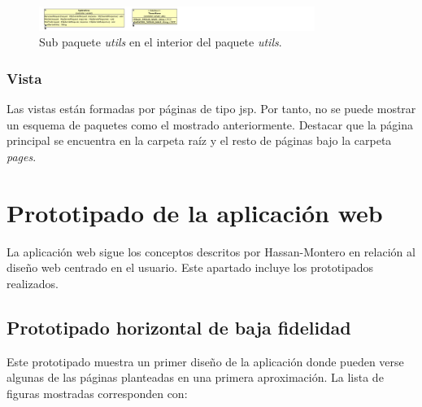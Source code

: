 \begin{figure}[!htbp]
  \centering
    \includegraphics[width=0.8\textwidth]{../img/diagramas/controller/servlet/tres.jpg}
  \caption{Sub paquete \textit{utils} en el interior del paquete \textit{utils}.}
  \label{util}
\end{figure}



\subsubsection{Vista}
Las vistas están formadas por páginas de tipo jsp. Por tanto, no se puede mostrar un esquema de paquetes como el mostrado anteriormente. Destacar que la página principal se encuentra en la carpeta raíz y el resto de páginas bajo la carpeta \textit{pages}.


\section{Prototipado de la aplicación web}

La aplicación web sigue los conceptos descritos por Hassan-Montero \cite{montero:info} en relación al diseño web centrado en el usuario. Este apartado incluye los prototipados realizados.

\subsection{Prototipado horizontal de baja fidelidad}
Este prototipado muestra un primer diseño de la aplicación donde pueden verse algunas de las páginas planteadas en una primera aproximación. La lista de figuras mostradas corresponden con:


